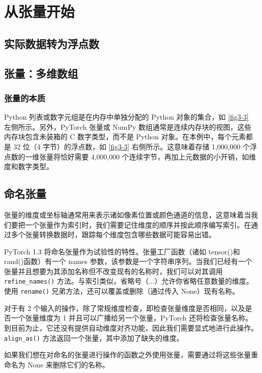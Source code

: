 \chapter{从张量开始\label{ch03}}
\section{实际数据转为浮点数}
\section{张量：多维数组}
\subsection{张量的本质}
Python 列表或数字元组是在内存中单独分配的 Python 对象的集合，如 \autoref{fig3-3} 左侧所示。另外，PyTorch 张量或 NumPy 数组通常是连续内存块的视图，这些内存块包含未装箱的 C 数字类型，而不是 Python 对象。在本例中，每个元素都是 32 位（4 字节）的浮点数，如 \autoref{fig3-3} 右侧所示。这意味着存储 1,000,000 个浮点数的一维张量将恰好需要 4,000,000 个连续字节，再加上元数据的小开销，如维度和数字类型。
\section{命名张量}
张量的维度或坐标轴通常用来表示诸如像素位置或颜色通道的信息，这意味着当我们要把一个张量作为索引时，我们需要记住维度的顺序并按此顺序编写索引。在通过多个张量转换数据时，跟踪每个维度包含哪些数据可能容易出错。

PyTorch 1.3 将命名张量作为试验性的特性。张量工厂函数（诸如 tensor()和 rand()函数）有一个 names 参数，该参数是一个字符串序列。当我们已经有一个张量并且想要为其添加名称但不改变现有的名称时，我们可以对其调用 \verb|refine_names()| 方法。与索引类似，省略号（$\dots$）允许你省略任意数量的维度。使用 \verb|rename()| 兄弟方法，还可以覆盖或删除（通过传入 None）现有名称。

对于有 2 个输入的操作，除了常规维度检查，即检查张量维度是否相同，以及是否一个张量维度为 1 并且可以广播给另一个张量，PyTorch 还将检查张量名称。到目前为止，它还没有提供自动维度对齐功能，因此我们需要显式地进行此操作。\verb|align_as()| 方法返回一个张量，其中添加了缺失的维度。

如果我们想在对命名的张量进行操作的函数之外使用张量，需要通过将这些张量重命名为 None 来删除它们的名称。
